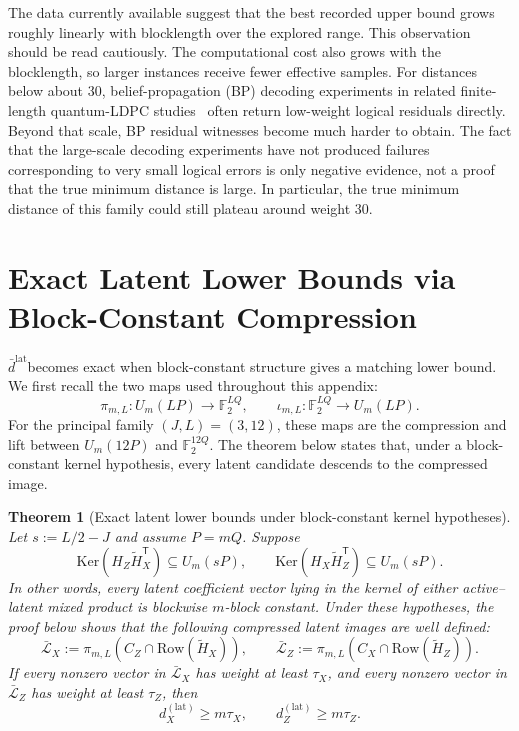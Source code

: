 \documentclass[11pt]{article}
\newcommand{\Ftwo}{\mathbb{F}_2}
\newcommand{\Ker}{\mathrm{Ker}}
\newcommand{\Row}{\mathrm{Row}}
\newcommand{\Htil}{\tilde{H}}
\newcommand{\dbound}[1]{\ensuremath{\bar{d}^{\mathrm{#1}}}}
\newcommand{\dlat}{\dbound{lat}}
\newcommand{\markededit}[1]{#1}
\theoremstyle{uprightthm}
\newtheorem{theorem}{Theorem}[section]
\begin{document}
\markededit{The data currently available suggest that the best recorded upper bound grows}
roughly linearly with blocklength over the explored range.  This observation
should be read cautiously.  The computational cost also grows with the
blocklength, so larger instances receive fewer effective samples.  For distances
below about \(30\), belief-propagation (BP) decoding experiments
in related finite-length quantum-LDPC studies~\cite{KasaiISIT2025,KasaiDegeneracy2025,KomotoKasaiSharpBP2025} often return
low-weight logical residuals directly.  Beyond that scale, BP residual witnesses
become much harder to obtain.  \markededit{The fact that} the large-scale decoding
experiments have not produced failures corresponding to very small logical
errors \markededit{is only negative evidence, not a proof that the true minimum distance is large}.  In
particular, the true minimum distance of this family could still plateau around
weight \(30\).

\appendix

\section{Exact Latent Lower Bounds via Block-Constant Compression}
\label{app:latent-lower-en}
\dlat becomes exact when block-constant structure gives a matching lower bound.
We first recall the two maps used throughout this appendix:
\[
\pi_{m,L}:U_m(LP)\to\Ftwo^{LQ},\qquad
\iota_{m,L}:\Ftwo^{LQ}\to U_m(LP).
\]
For the principal family $(J,L)=(3,12)$, these maps are the compression and lift
between $U_m(12P)$ and $\Ftwo^{12Q}$.  The theorem below states that, under a
block-constant kernel hypothesis, every latent candidate descends to the
compressed image.

\begin{theorem}[Exact latent lower bounds under block-constant kernel hypotheses]
\label{thm:latent-lower-en}
Let $s:=L/2-J$ and assume $P=mQ$. Suppose
\[
\Ker(H_Z\Htil_X^{\mathsf T})\subseteq U_m(sP),
\qquad
\Ker(H_X\Htil_Z^{\mathsf T})\subseteq U_m(sP).
\]
In other words, every latent coefficient vector lying in the kernel of either
active--latent mixed product is blockwise $m$-block constant. Under these
hypotheses, the proof below shows that the following compressed latent images
are well defined:
\[
\bar{\mathcal L}_X:=\pi_{m,L}(C_Z\cap \Row(\Htil_X)),\qquad
\bar{\mathcal L}_Z:=\pi_{m,L}(C_X\cap \Row(\Htil_Z)).
\]
If every nonzero vector in $\bar{\mathcal L}_X$ has weight at least $\tau_X$, and every nonzero vector in $\bar{\mathcal L}_Z$ has weight at least $\tau_Z$, then
\[
d_X^{(\mathrm{lat})}\ge m\tau_X,\qquad
d_Z^{(\mathrm{lat})}\ge m\tau_Z.
\]
\end{theorem}
\end{document}
